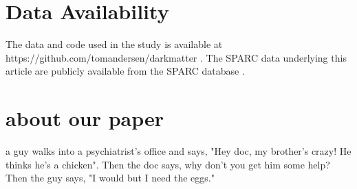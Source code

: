 \documentclass[fleqn,usenatbib]{mnras}
\begin{document}
\section*{Data Availability}

The data and code used in the study is available at https://github.com/tomandersen/darkmatter . 
The SPARC data underlying this article are publicly available from the SPARC database \citep{lelliSPARCMassModels2016}. 



\bsp

\section{about our paper}
a guy walks into a psychiatrist's office and says, "Hey doc, my brother's crazy! He thinks he's a chicken". Then the doc says, why don't you get him some help? Then the guy says, "I would but I need the eggs." 
\label{lastpage}
\end{document}
